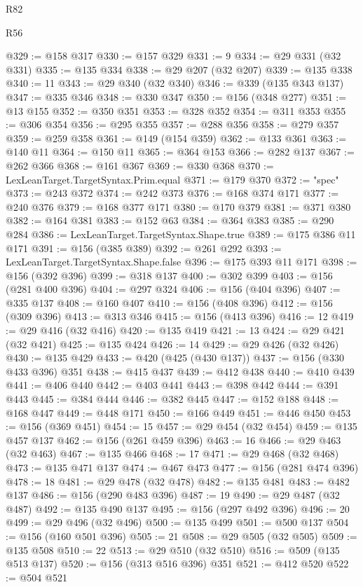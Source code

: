 \begin{lexlean}{R82}
\begin{lexlean}{R56}
\begin{coremodule}
{{{{{{{{{{{{{{{{{{{{{{{{{{{{{{{{{{{{{{{{{{{{{{{{{{{{{{{{{{{{{{{{{{{{{{{{{{{{{{{{{{{{{{{{{{{{{{{{{{{{{{{{{{{{{{{{{{{{{{{{{{{{{{{{{{{{{{{{{{{{{{{{{{{{{{{{{{{{{{{{{{{{{{{{{{{{{{{{{{{{{{{{{{{{{{{{{{{{{{{{{{{{{{{{{{{@329 := @158 @317
@330 := @157 @329
@331 := 9
@334 := @29 @331 (@32 @331)
@335 := @135 @334
@338 := @29 @207 (@32 @207)
@339 := @135 @338
@340 := 11
@343 := @29 @340 (@32 @340)
@346 := @339 (@135 @343 @137)
@347 := @335 @346
@348 := @330 @347
@350 := @156 (@348 @277)
@351 := @13 @155
@352 := @350 @351
@353 := @328 @352
@354 := @311 @353
@355 := @306 @354
@356 := @295 @355
@357 := @288 @356
@358 := @279 @357
@359 := @259 @358
@361 := @149 (@154 @359)
@362 := @133 @361
@363 := @140 @11
@364 := @150 @11
@365 := @364 @153
@366 := @282 @137
@367 := @262 @366
@368 := @161 @367
@369 := @330 @368
@370 := LexLeanTarget.TargetSyntax.Prim.equal
@371 := @179 @370
@372 := "spec"
@373 := @243 @372
@374 := @242 @373
@376 := @168 @374 @171
@377 := @240 @376
@379 := @168 @377 @171
@380 := @170 @379
@381 := @371 @380
@382 := @164 @381
@383 := @152 @63
@384 := @364 @383
@385 := @290 @284
@386 := LexLeanTarget.TargetSyntax.Shape.true
@389 := @175 @386 @11 @171
@391 := @156 (@385 @389)
@392 := @261 @292
@393 := LexLeanTarget.TargetSyntax.Shape.false
@396 := @175 @393 @11 @171
@398 := @156 (@392 @396)
@399 := @318 @137
@400 := @302 @399
@403 := @156 (@281 @400 @396)
@404 := @297 @324
@406 := @156 (@404 @396)
@407 := @335 @137
@408 := @160 @407
@410 := @156 (@408 @396)
@412 := @156 (@309 @396)
@413 := @313 @346
@415 := @156 (@413 @396)
@416 := 12
@419 := @29 @416 (@32 @416)
@420 := @135 @419
@421 := 13
@424 := @29 @421 (@32 @421)
@425 := @135 @424
@426 := 14
@429 := @29 @426 (@32 @426)
@430 := @135 @429
@433 := @420 (@425 (@430 @137))
@437 := @156 (@330 @433 @396) @351
@438 := @415 @437
@439 := @412 @438
@440 := @410 @439
@441 := @406 @440
@442 := @403 @441
@443 := @398 @442
@444 := @391 @443
@445 := @384 @444
@446 := @382 @445
@447 := @152 @188
@448 := @168 @447
@449 := @448 @171
@450 := @166 @449
@451 := @446 @450
@453 := @156 (@369 @451)
@454 := 15
@457 := @29 @454 (@32 @454)
@459 := @135 @457 @137
@462 := @156 (@261 @459 @396)
@463 := 16
@466 := @29 @463 (@32 @463)
@467 := @135 @466
@468 := 17
@471 := @29 @468 (@32 @468)
@473 := @135 @471 @137
@474 := @467 @473
@477 := @156 (@281 @474 @396)
@478 := 18
@481 := @29 @478 (@32 @478)
@482 := @135 @481
@483 := @482 @137
@486 := @156 (@290 @483 @396)
@487 := 19
@490 := @29 @487 (@32 @487)
@492 := @135 @490 @137
@495 := @156 (@297 @492 @396)
@496 := 20
@499 := @29 @496 (@32 @496)
@500 := @135 @499
@501 := @500 @137
@504 := @156 (@160 @501 @396)
@505 := 21
@508 := @29 @505 (@32 @505)
@509 := @135 @508
@510 := 22
@513 := @29 @510 (@32 @510)
@516 := @509 (@135 @513 @137)
@520 := @156 (@313 @516 @396) @351
@521 := @412 @520
@522 := @504 @521
}}}}}}}}}}}}}}}}}}}}}}}}}}}}}}}}}}}}}}}}}}}}}}}}}}}}}}}}}}}}}}}}}}}}}}}}}}}}}}}}}}}}}}}}}}}}}}}}}}}}}}}}}}}}}}}}}}}}}}}}}}}}}}}}}}}}}}}}}}}}}}}}}}}}}}}}}}}}}}}}}}}}}}}}}}}}}}}}}}}}}}}}}}}}}}}}}}}}}}}}}}}}}}}}}}}
\end{coremodule}
\end{lexlean}
\end{lexlean}
